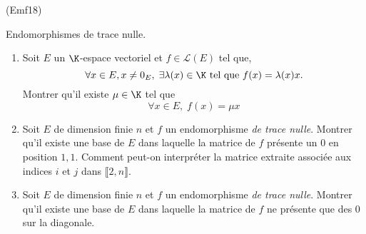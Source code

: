 \begin{tiny}(Emf18)\end{tiny} Endomorphismes de trace nulle.
\begin{enumerate}
 \item Soit $E$ un $\K$-espace vectoriel et $f \in \mathcal{L}(E)$ tel que,
\[
  \forall x\in E, x\neq 0_E,\; \exists \lambda(x)\in \K \text{ tel que } f(x)=\lambda(x)x.
\]
Montrer qu'il existe $\mu\in \K$ tel que 
\begin{displaymath}
 \forall x\in E,\; f(x)=\mu x
\end{displaymath}
\item Soit $E$ de dimension finie $n$ et $f$ un endomorphisme \emph{de trace nulle}. Montrer qu'il existe une base de $E$ dans laquelle la matrice de $f$ présente un $0$ en position $1,1$. Comment peut-on interpréter la matrice extraite associée aux indices $i$ et $j$ dans $\llbracket 2,n\rrbracket$.
\item Soit $E$ de dimension finie $n$ et $f$ un endomorphisme \emph{de trace nulle}. Montrer qu'il existe une base de $E$ dans laquelle la matrice de $f$ ne présente que des $0$ sur la diagonale.
\end{enumerate}
 
